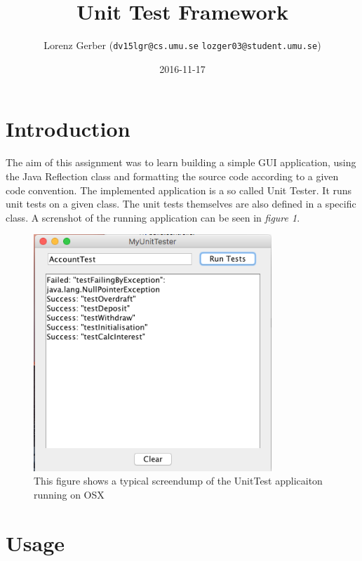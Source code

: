 \documentclass[a4paper,11pt,twoside]{article}
\title{Unit Test Framework}
\author{Lorenz Gerber ({\tt{dv15lgr@cs.umu.se}} {\tt{lozger03@student.umu.se}})}
\date{2016-11-17}
\begin{document}
\lstset{language=C}
\maketitle
\thispagestyle{empty}
\newpage
\tableofcontents
\thispagestyle{empty}
\newpage

\clearpage
{}

\section{Introduction}
The aim of this assignment was to learn building a simple GUI application, using the Java Reflection class and formatting the source code according to a given code convention. The implemented application is a so called Unit Tester. It runs unit tests on a given class. The unit tests themselves are also defined in a specific class. A screnshot of the running application can be seen in \textit{figure 1}.  

\begin{figure}[p]
    \centering
    \includegraphics[width=0.8\textwidth]{screenshot.png}
    \caption{This figure shows a typical screendump of the UnitTest applicaiton running on OSX}
    \label{fig:screenshot}
\end{figure}

\section{Usage} 
\end{document}
